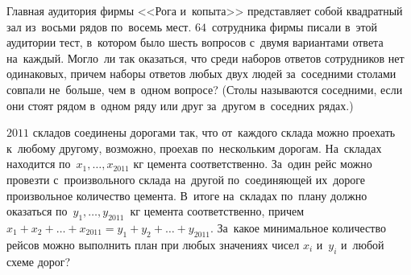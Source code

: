 \begin{problems}
\item
Главная аудитория фирмы <<Рога и~копыта>> представляет собой квадратный зал
из~восьми рядов по~восемь мест.
$64$~сотрудника фирмы писали в~этой аудитории тест, в~котором было шесть
вопросов с~двумя вариантами ответа на~каждый.
Могло~ли так оказаться, что среди наборов ответов сотрудников нет одинаковых,
причем наборы ответов любых двух людей за~соседними столами совпали не~больше,
чем в~одном вопросе?
(Столы называются соседними, если они стоят рядом в~одном ряду или друг
за~другом в~соседних рядах.)

\item
$2011$ складов соединены дорогами так, что от~каждого склада можно
проехать к~любому другому, возможно, проехав по~нескольким дорогам.
На~складах находится по~$x_1, \ldots, x_{2011}$ кг цемента соответственно.
За~один рейс можно провезти с~произвольного склада на~другой по~соединяющей
их~дороге произвольное количество цемента.
В~итоге на~складах по~плану должно оказаться по~$y_1, \ldots, y_{2011}$~кг
цемента соответственно, причем
$x_1 + x_2 + \ldots + x_{2011} = y_1 + y_2 + \ldots + y_{2011}$.
За~какое минимальное количество рейсов можно выполнить план при любых значениях
чисел $x_i$ и~$y_i$ и~любой схеме дорог?

\end{problems}

